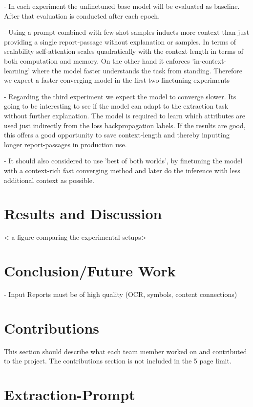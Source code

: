 \documentclass{article}
\begin{document}
- In each experiment the unfinetuned base model will be evaluated as baseline. After that evaluation is conducted after each epoch.

- Using a prompt combined with few-shot samples inducts more context than just providing a single report-passage without explanation or samples. In terms of scalability self-attention scales quadratically with the context length in terms of both computation and memory. On the other hand it enforces 'in-context-learning' where the model faster understands the task from standing. Therefore we expect a faster converging model in the first two finetuning-experiments

- Regarding the third experiment we expect the model to converge slower. Its going to be interesting to see if the model can adapt to the extraction task without further explanation. The model is required to learn which attributes are used just indirectly from the loss backpropagation labels. If the results are good, this offers a good opportunity to save context-length and thereby inputting longer report-passages in production use.

- It should also considered to use 'best of both worlds', by finetuning the model with a context-rich fast converging method and later do the inference with less additional context as possible.


\section{Results and Discussion}


< a figure comparing the experimental setups>




\section{Conclusion/Future Work}

- Input Reports must be of high quality (OCR, symbols, content connections)


\section{Contributions}
This section should describe what each team member worked on and contributed to the project.
The contributions section is not included in the 5 page limit. 

\appendix
\section{Extraction-Prompt} \label{appendix: extraction_prompt}




  
 
\end{document}

